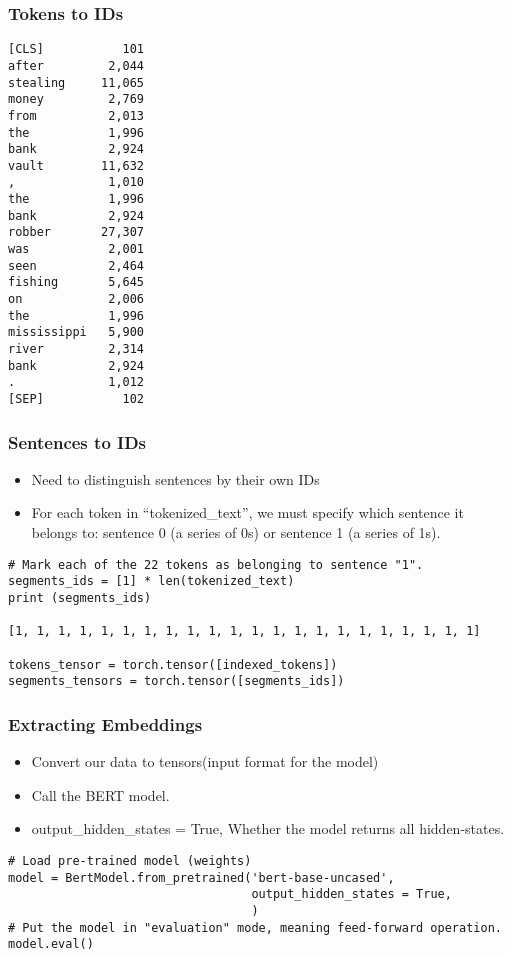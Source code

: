 \begin{frame}[fragile]\frametitle{Tokens to IDs}

\begin{lstlisting}
[CLS]           101
after         2,044
stealing     11,065
money         2,769
from          2,013
the           1,996
bank          2,924
vault        11,632
,             1,010
the           1,996
bank          2,924
robber       27,307
was           2,001
seen          2,464
fishing       5,645
on            2,006
the           1,996
mississippi   5,900
river         2,314
bank          2,924
.             1,012
[SEP]           102
\end{lstlisting}

\end{frame}

\begin{frame}[fragile]\frametitle{Sentences to IDs}
\begin{itemize}
\item Need to distinguish sentences by their own IDs
\item For each token in ``tokenized\_text'', we must specify which sentence it belongs to: sentence 0 (a series of 0s) or sentence 1 (a series of 1s). 
\end{itemize}

\begin{lstlisting}
# Mark each of the 22 tokens as belonging to sentence "1".
segments_ids = [1] * len(tokenized_text)
print (segments_ids)

[1, 1, 1, 1, 1, 1, 1, 1, 1, 1, 1, 1, 1, 1, 1, 1, 1, 1, 1, 1, 1, 1]

tokens_tensor = torch.tensor([indexed_tokens])
segments_tensors = torch.tensor([segments_ids])
\end{lstlisting}

\end{frame}

\begin{frame}[fragile]\frametitle{Extracting Embeddings}
\begin{itemize}
\item Convert our data to tensors(input format for the model)
\item Call the BERT model.
\item output\_hidden\_states = True, Whether the model returns all hidden-states.
\end{itemize}


\begin{lstlisting}
# Load pre-trained model (weights)
model = BertModel.from_pretrained('bert-base-uncased',
                                  output_hidden_states = True, 
                                  )
# Put the model in "evaluation" mode, meaning feed-forward operation.
model.eval()
\end{lstlisting}

\end{frame}

